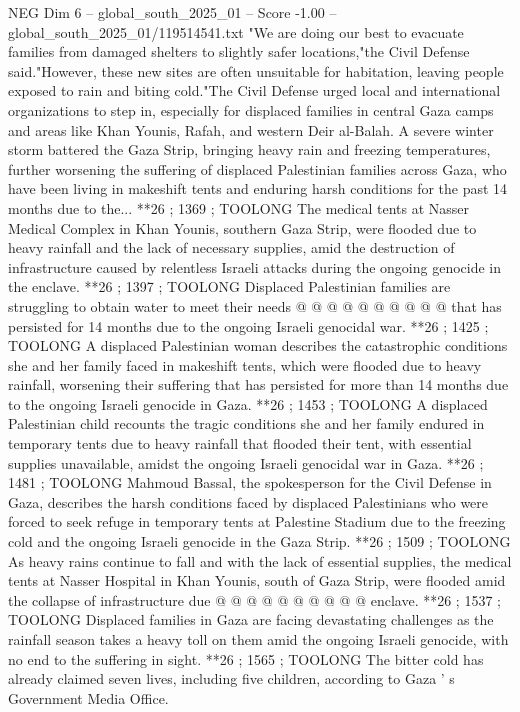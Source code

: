 \begin{textsample}{NEG Dim 6 – global\_south\_2025\_01 – Score -1.00 – global\_south\_2025\_01/119514541.txt}  \label{ex:f6_neg_005}
"We are doing our best to evacuate families from damaged shelters to slightly safer locations,"the Civil Defense said."However, these new sites are often unsuitable for habitation, leaving people exposed to rain and biting cold."The Civil Defense urged local and international organizations to step in, especially for displaced families in central Gaza camps and areas like Khan Younis, Rafah, and western Deir al-Balah.
A severe winter storm battered the Gaza Strip, bringing heavy rain and freezing temperatures, further worsening the suffering of displaced Palestinian families across Gaza, who have been living in makeshift tents and enduring harsh conditions for the past 14 months due to the... **26 ; 1369 ; TOOLONG The medical tents at Nasser Medical Complex in Khan Younis, southern Gaza Strip, were flooded due to heavy rainfall and the lack of necessary supplies, amid the destruction of infrastructure caused by relentless Israeli attacks during the ongoing genocide in the enclave. **26 ; 1397 ; TOOLONG Displaced Palestinian families are struggling to obtain water to meet their needs @ @ @ @ @ @ @ @ @ @ that has persisted for 14 months due to the ongoing Israeli genocidal war. **26 ; 1425 ; TOOLONG A displaced Palestinian woman describes the catastrophic conditions she and her family faced in makeshift tents, which were flooded due to heavy rainfall, worsening their suffering that has persisted for more than 14 months due to the ongoing Israeli genocide in Gaza. **26 ; 1453 ; TOOLONG A displaced Palestinian child recounts the tragic conditions she and her family endured in temporary tents due to heavy rainfall that flooded their tent, with essential supplies unavailable, amidst the ongoing Israeli genocidal war in Gaza. **26 ; 1481 ; TOOLONG Mahmoud Bassal, the spokesperson for the Civil Defense in Gaza, describes the harsh conditions faced by displaced Palestinians who were forced to seek refuge in temporary tents at Palestine Stadium due to the freezing cold and the ongoing Israeli genocide in the Gaza Strip. **26 ; 1509 ; TOOLONG As heavy rains continue to fall and with the lack of essential supplies, the medical tents at Nasser Hospital in Khan Younis, south of Gaza Strip, were flooded amid the collapse of infrastructure due @ @ @ @ @ @ @ @ @ @ enclave. **26 ; 1537 ; TOOLONG Displaced families in Gaza are facing devastating challenges as the rainfall season takes a heavy toll on them amid the ongoing Israeli genocide, with no end to the suffering in sight. **26 ; 1565 ; TOOLONG The bitter cold has already claimed seven lives, including five children, according to Gaza ' s Government Media Office.

\end{textsample}
